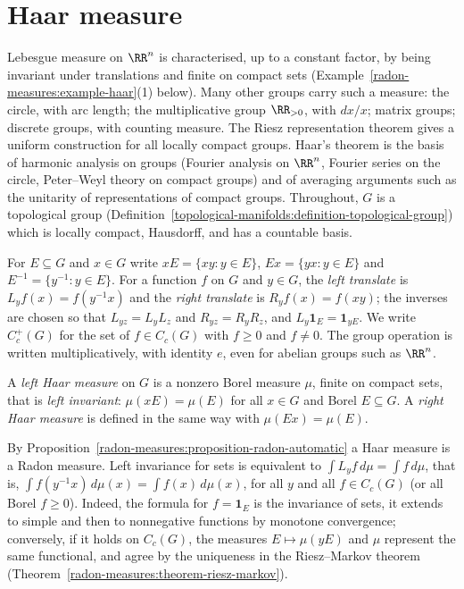 \section{Haar measure}\label{radon-measures:section-haar}

Lebesgue measure on $\RR^n$ is characterised, up to a constant factor, by being invariant under translations and finite on compact sets (Example~\ref{radon-measures:example-haar}(1) below). Many other groups
carry such a measure: the circle, with arc length; the multiplicative group $\RR_{>0}$, with $dx/x$; matrix groups; discrete groups, with counting measure. The Riesz representation theorem gives a uniform
construction for all locally compact groups. Haar's theorem is the basis of harmonic analysis on groups (Fourier analysis on $\RR^n$, Fourier series on the circle, Peter--Weyl theory on compact
groups) and of averaging arguments such as the unitarity of representations of compact groups. Throughout, $G$ is a topological group (Definition~\ref{topological-manifolds:definition-topological-group})
which is locally compact, Hausdorff, and has a countable basis.

\begin{notation}\label{radon-measures:notation-translates}
For $E \subseteq G$ and $x \in G$ write $xE = \{xy : y \in E\}$, $Ex = \{yx : y \in E\}$ and $E^{-1} = \{y^{-1} : y \in E\}$. For a function $f$ on $G$ and $y \in G$, the \emph{left translate} is
$L_yf(x) = f(y^{-1}x)$ and the \emph{right translate} is $R_yf(x) = f(xy)$; the inverses are chosen so that $L_{yz} = L_yL_z$ and $R_{yz} = R_yR_z$, and $L_y\mathbf{1}_E = \mathbf{1}_{yE}$. We write
$C_c^+(G)$ for the set of $f \in C_c(G)$ with $f \geq 0$ and $f \neq 0$. The group operation is written multiplicatively, with identity $e$, even for abelian groups such as $\RR^n$.
\end{notation}

\begin{definition}\label{radon-measures:definition-haar}
A \emph{left Haar measure} on $G$ is a nonzero Borel measure $\mu$, finite on compact sets, that is \emph{left invariant}: $\mu(xE) = \mu(E)$ for all $x \in G$ and Borel $E \subseteq G$. A \emph{right Haar
measure} is defined in the same way with $\mu(Ex) = \mu(E)$.
\end{definition}

By Proposition~\ref{radon-measures:proposition-radon-automatic} a Haar measure is a Radon measure. Left invariance for sets is equivalent to $\int L_yf\,d\mu = \int f\,d\mu$, that is,
$\int f(y^{-1}x)\,d\mu(x) = \int f(x)\,d\mu(x)$, for all $y$ and all $f \in C_c(G)$ (or all Borel $f \geq 0$). Indeed, the formula for $f = \mathbf{1}_E$ is the invariance of sets, it extends to simple and
then to nonnegative functions by monotone convergence; conversely, if it holds on $C_c(G)$, the measures $E \mapsto \mu(yE)$ and $\mu$ represent the same functional, and agree by the uniqueness in the
Riesz--Markov theorem (Theorem~\ref{radon-measures:theorem-riesz-markov}).

